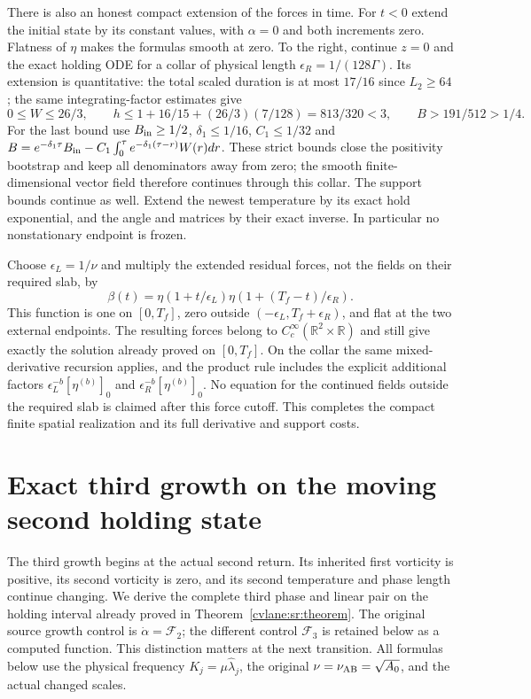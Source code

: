 There is also an honest compact extension of the forces in time.
For $t<0$ extend the initial state by its constant values, with
$\alpha=0$ and both increments zero. Flatness of $\eta$ makes
the formulas smooth at zero. To the right, continue $z=0$ and
the exact holding ODE for a collar of physical length
$\epsilon_R=1/(128\Gamma)$. Its extension is quantitative:
the total scaled duration is at most $17/16$ since $L_2\geq64$;
the same integrating-factor estimates give
\[
 0\leq W\leq26/3,\qquad
 h\leq1+16/15+(26/3)(7/128)=813/320<3,
 \qquad B>191/512>1/4.
\]
For the last bound use $B_{\rm in}\geq1/2$,
$\delta_1\leq1/16$, $C_1\leq1/32$ and
$B=e^{-\delta_1\tau}B_{\rm in}
       -C_1\int_0^\tau e^{-\delta_1(\tau-r)}W(r)dr$.
These strict bounds close the positivity bootstrap and keep all
denominators away from zero; the smooth finite-dimensional vector
field therefore continues through this collar. The support bounds
continue as well. Extend the newest temperature by its exact hold
exponential, and the angle and matrices by their exact inverse.
In particular no nonstationary endpoint is frozen.

Choose $\epsilon_L=1/\nu$ and multiply the extended residual
forces, not the fields on their required slab, by
\[
 \beta(t)=\eta(1+t/\epsilon_L)
                       \eta(1+(T_f-t)/\epsilon_R).
\]
This function is one on $[0,T_f]$, zero outside
$(-\epsilon_L,T_f+\epsilon_R)$, and flat at the two external
endpoints. The resulting forces belong to
$C_c^\infty(\mathbb R^2\times\mathbb R)$ and still give exactly
the solution already proved on $[0,T_f]$. On the collar the same
mixed-derivative recursion applies, and the product rule includes
the explicit additional factors $\epsilon_L^{-b}[\eta^{(b)}]_0$
and $\epsilon_R^{-b}[\eta^{(b)}]_0$. No equation for the
continued fields outside the required slab is claimed after this
force cutoff. This completes the compact finite spatial realization
and its full derivative and support costs.


\section{Exact third growth on the moving second holding state}
\label{cvlane:tg:section}

The third growth begins at the actual second return. Its inherited
first vorticity is positive, its second vorticity is zero, and its
second temperature and phase length continue changing. We derive the
complete third phase and linear pair on the holding interval already
proved in Theorem~\ref{cvlane:sr:theorem}. The original source growth control
is $\dot\alpha=\mathcal F_2$; the different control
$\mathcal F_3$ is retained below as a computed function. This distinction
matters at the next transition. All formulas below use the physical
frequency $K_j=\mu\widehat\lambda_j$, the original
$\nu=\nu_{\rm AB}=\sqrt{A_0}$, and the actual changed scales.

